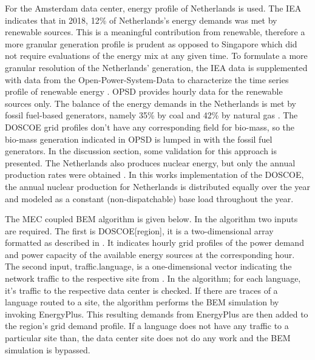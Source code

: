   For the Amsterdam data center, energy profile of Netherlands is used. The IEA indicates that in 2018, 12\% of Netherlands's energy demands was met by renewable sources. This is a meaningful contribution from renewable, therefore a more granular generation profile is prudent as opposed to Singapore which did not require evaluations of the energy mix at any given time.  To formulate a more granular resolution of the Netherlands' generation, the IEA data is supplemented with data from the Open-Power-System-Data to characterize the time series profile of renewable energy \citep{ospd19}. OPSD provides hourly data for the renewable sources only. The balance of the energy demands in the Netherlands is met by fossil fuel-based generators, namely 35\% by coal and 42\% by natural gas \citep{eia20b}. The DOSCOE grid profiles don’t have any corresponding field for bio-mass, so the bio-mass generation indicated in OPSD is lumped in with the fossil fuel generators. In the discussion section, some validation for this approach is presented. The Netherlands also produces nuclear energy, but only the annual production rates were obtained \citep{eia20b}. In this works implementation of the DOSCOE, the annual nuclear production for Netherlands is distributed equally over the year and modeled as a constant (non-dispatchable) base load throughout the year.  

  The MEC coupled BEM algorithm is given below. In the algorithm two inputs are required. The first is DOSCOE[region], it is a two-dimensional array formatted as described in \citep{platt17}. It indicates hourly grid profiles of the power demand and power capacity of the available energy sources at the corresponding hour. The second input, traffic.language, is a one-dimensional vector indicating the network traffic to the respective site from \cite{kumar20b}. In the algorithm; for each language, it’s traffic to the respective data center is checked. If there are traces of a language routed to a site, the algorithm performs the BEM simulation by invoking EnergyPlus. This resulting demands from EnergyPlus are then added to the region’s grid demand profile. If a language does not have any traffic to a particular site than, the data center site does not do any work and the BEM simulation is bypassed.  

